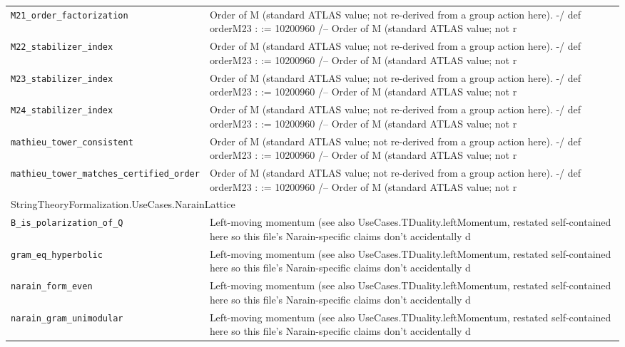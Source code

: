 \begin{longtable}{p{}p{}}
\quad\texttt{\footnotesize M21\_order\_factorization} & {\footnotesize Order of M (standard ATLAS value; not re-derived from a group action here). -/ def orderM23 :  := 10200960 /-- Order of M (standard ATLAS value; not r} \\
\quad\texttt{\footnotesize M22\_stabilizer\_index} & {\footnotesize Order of M (standard ATLAS value; not re-derived from a group action here). -/ def orderM23 :  := 10200960 /-- Order of M (standard ATLAS value; not r} \\
\quad\texttt{\footnotesize M23\_stabilizer\_index} & {\footnotesize Order of M (standard ATLAS value; not re-derived from a group action here). -/ def orderM23 :  := 10200960 /-- Order of M (standard ATLAS value; not r} \\
\quad\texttt{\footnotesize M24\_stabilizer\_index} & {\footnotesize Order of M (standard ATLAS value; not re-derived from a group action here). -/ def orderM23 :  := 10200960 /-- Order of M (standard ATLAS value; not r} \\
\quad\texttt{\footnotesize mathieu\_tower\_consistent} & {\footnotesize Order of M (standard ATLAS value; not re-derived from a group action here). -/ def orderM23 :  := 10200960 /-- Order of M (standard ATLAS value; not r} \\
\quad\texttt{\footnotesize mathieu\_tower\_matches\_certified\_order} & {\footnotesize Order of M (standard ATLAS value; not re-derived from a group action here). -/ def orderM23 :  := 10200960 /-- Order of M (standard ATLAS value; not r} \\
\multicolumn{2}{l}{\textsf{\small StringTheoryFormalization.UseCases.NarainLattice}} \\
\quad\texttt{\footnotesize B\_is\_polarization\_of\_Q} & {\footnotesize Left-moving momentum (see also UseCases.TDuality.leftMomentum, restated self-contained here so this file's Narain-specific claims don't accidentally d} \\
\quad\texttt{\footnotesize gram\_eq\_hyperbolic} & {\footnotesize Left-moving momentum (see also UseCases.TDuality.leftMomentum, restated self-contained here so this file's Narain-specific claims don't accidentally d} \\
\quad\texttt{\footnotesize narain\_form\_even} & {\footnotesize Left-moving momentum (see also UseCases.TDuality.leftMomentum, restated self-contained here so this file's Narain-specific claims don't accidentally d} \\
\quad\texttt{\footnotesize narain\_gram\_unimodular} & {\footnotesize Left-moving momentum (see also UseCases.TDuality.leftMomentum, restated self-contained here so this file's Narain-specific claims don't accidentally d} \\

\end{longtable}
